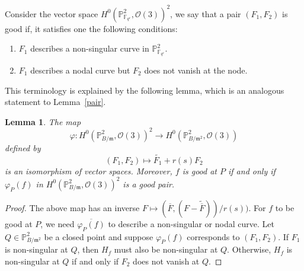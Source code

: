 \documentclass[12pt]{article}
\theoremstyle{plain}
\newtheorem{lemma}[equation]{Lemma}
\theoremstyle{definition}
\newcommand{\fm}{\mathfrak{m}}
\newcommand{\IF}{\mathbb{F}}
\newcommand{\IP}{\mathbb{P}}
\newcommand{\sO}{\mathcal{O}}
\newcommand{\<}{\langle}
\renewcommand{\>}{\rangle}
\def\wt{\widetilde}
\begin{document}
Consider the vector space $H^0(\IP^2_{\IF_{q^e}}, \sO(3))^2$, we say that a pair $(F_1, F_2)$ is good if, it satisfies one the following conditions:
\begin{enumerate}
\item $F_1$ describes a non-singular curve in $\IP^2_{\IF_{q^e}}$.
\item $F_1$ describes a nodal curve but $F_2$ does not vanish at the node.
\end{enumerate}  
This terminology is explained by the following lemma, which is an analogous statement to Lemma~\ref{pair}. 
\begin{lemma}
\label{conversion}
The map
$$ \varphi : H^0(\IP^2_{B/\fm} , \sO(3))^2 \to H^0(\IP^2_{B/\fm^2}, \sO(3))$$ defined by 
$$ (F_1, F_2) \mapsto \wt{F_1} + r(s) F_2 $$
is an isomorphism of vector spaces. Moreover, $f$ is good at $P$ if and only if $\varphi_P(f)$ in $H^0(\IP^2_{B/\fm} , \sO(3))^2$ is a good pair. 
\end{lemma}
\begin{proof}
The above map has an inverse $F \mapsto (\overline{F}, (F - \wt{\overline{F}}))/r(s))$. For $f$ to be good at $P$, we need $\overline{\varphi_P(f)}$ to describe a non-singular or nodal curve. Let $Q \in \IP^2_{B/\fm^2}$ be a closed point and suppose $\varphi_P(f)$ corresponds to $(F_1, F_2)$. If $F_1$ is non-singular at $Q$, then $H_f$ must also be non-singular at $Q$. Otherwise, $H_f$ is non-singular at $Q$ if and only if $F_2$ does not vanish at $Q$. 
\end{proof}
\end{document}

